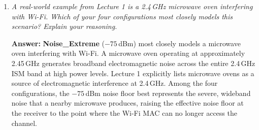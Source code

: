 \documentclass[12pt]{article}
\begin{document}
\begin{enumerate}
    In \textbf{Noise\_Extreme}, no packet animations appear at all. INET raises an
    error dialog during network initialisation (\textit{``Receiver is busy without
    any ongoing transmission''}) and the simulation halts before any traffic is
    generated. The canvas remains empty. The visual contrast is stark: Noise\_High
    shows continuous wireless traffic, while Noise\_Extreme produces an immediate
    initialisation failure with a blank canvas.

    \item \textit{A real-world example from Lecture 1 is a 2.4\,GHz microwave oven
          interfering with Wi-Fi. Which of your four configurations most closely
          models this scenario? Explain your reasoning.}

    \textbf{Answer:}
    \textbf{Noise\_Extreme} ($-75$\,dBm) most closely models a microwave oven
    interfering with Wi-Fi. A microwave oven operating at approximately 2.45\,GHz
    generates broadband electromagnetic noise across the entire 2.4\,GHz ISM band
    at high power levels. Lecture 1 explicitly lists microwave ovens as a source of
    electromagnetic interference at 2.4\,GHz. Among the four configurations, the
    $-75$\,dBm noise floor best represents the severe, wideband noise that a nearby
    microwave produces, raising the effective noise floor at the receiver to the point
    where the Wi-Fi MAC can no longer access the channel.

\end{enumerate}

\end{document}
